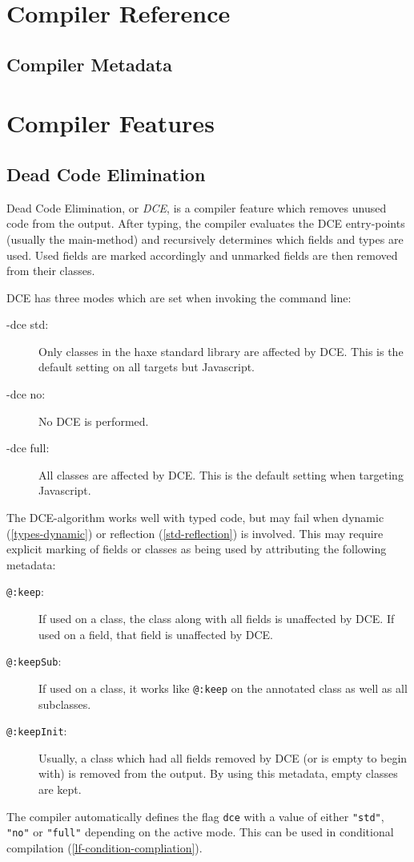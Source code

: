\documentclass[a4paper,oneside]{book}
\newcommand{\target}[1]{#1}
\newcommand{\expr}[1]{\texttt{#1}}
\newcommand{\tref}[2]{#1 (\ref{#2})}
\begin{document}
\chapter{Compiler Reference}
\label{compiler-reference}

\section{Compiler Metadata}
\label{cr-metadata}

\chapter{Compiler Features}
\label{cr-features}

\section{Dead Code Elimination}
\label{cr-dce}

Dead Code Elimination, or \emph{DCE}, is a compiler feature which removes unused code from the output. After typing, the compiler evaluates the DCE entry-points (usually the main-method) and recursively determines which fields and types are used. Used fields are marked accordingly and unmarked fields are then removed from their classes.

DCE has three modes which are set when invoking the command line:

\begin{description}
	\item[-dce std:] Only classes in the haxe standard library are affected by DCE. This is the default setting on all targets but \target{Javascript}.
	\item[-dce no:] No DCE is performed.
	\item[-dce full:] All classes are affected by DCE. This is the default setting when targeting \target{Javascript}.
\end{description}
The DCE-algorithm works well with typed code, but may fail when \tref{dynamic}{types-dynamic} or \tref{reflection}{std-reflection} is involved. This may require explicit marking of fields or classes as being used by attributing the following metadata:

\begin{description}
	\item[\expr{@:keep}:] If used on a class, the class along with all fields is unaffected by DCE. If used on a field, that field is unaffected by DCE.
	\item[\expr{@:keepSub}:] If used on a class, it works like \expr{@:keep} on the annotated class as well as all subclasses.
	\item[\expr{@:keepInit}:] Usually, a class which had all fields removed by DCE (or is empty to begin with) is removed from the output. By using this metadata, empty classes are kept.
\end{description}
The compiler automatically defines the flag \expr{dce} with a value of either \expr{"std"}, \expr{"no"} or \expr{"full"} depending on the active mode. This can be used in \tref{conditional compilation}{lf-condition-compliation}.
\end{document}

